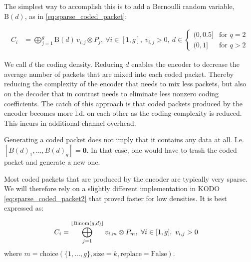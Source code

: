 The simplest way to accomplish this is to add a Bernoulli random
variable, $\text{B}(d)$, as in \ref{eq:sparse_coded_packet}:

\begin{align} \label{eq:sparse_coded_packet}
    C_i  &= \bigoplus_{j=1}^{g} \text{B}(d) \, v_{i,j} \otimes P_j ,\ \forall i \in [1,g] ,\
    v_{i,j} > 0,\
    d \in
    \begin{cases}
        {(0,0.5]} & \text{for } q = 2 \\
        {(0,1]} & \text{for } q > 2
    \end{cases}
\end{align}

We call $d$ the coding density.
Reducing $d$ enables the encoder to decrease the average number of packets that
are mixed into each coded packet. Thereby reducing the complexity of the
encoder that needs to mix less packets, but also on the decoder that in
contrast needs to eliminate less nonzero coding coefficients. The catch of this
approach is that coded packets produced by the encoder becomes more \ac{l.d.}
on each other as the coding complexity is reduced. This incurs in additional
channel overhead.

Generating a coded packet does not imply that it contains any data at all. I.e.
$ \left[ B(d)_{1}, \ldots, B(d)_{g} \right] = \mathbf{0}$.
In that case, one would have to trash the coded packet and generate a new one.

Most coded packets that are produced by the encoder are typically very sparse.
We will therefore rely on a slightly different implementation in KODO
\ref{eq:sparse_coded_packet2} that proved faster for low densities. It is best
expressed as:

\begin{align} \label{eq:sparse_coded_packet2}
    C_i  &= \bigoplus_{j=1}^{\lfloor\text{Binom}(g,d)\rfloor} v_{i,m} \otimes P_{m} ,\
    \forall i \in [1,g] ,\
    v_{i,j} > 0
\end{align}
where
$m = \text{choice}(\{1,\dots,g\}, \text{size}=k, \text{replace}=\text{False})$.


%

